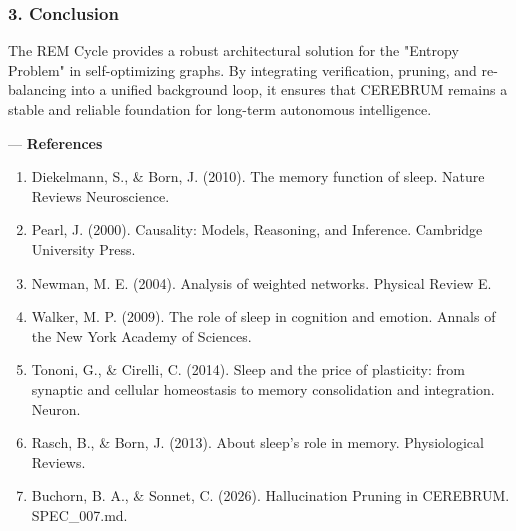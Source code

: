 \documentclass[10pt,journal,compsoc]{IEEEtran}
\begin{document}
\subsubsection{3. Conclusion}
The REM Cycle provides a robust archi\-tectural solution for the "Entropy Problem" in self-optimizing graphs. By integrating verif\-ication, pruning, and re-balancing into a unified background loop, it ensures that CEREBRUM remains a stable and reliable foundation for long-term autonomous intel\-ligence.

---
\textbf{References}
\begin{enumerate}
\item Diekelmann, S., \& Born, J. (2010). The memory function of sleep. Nature Reviews Neuros\-cience.
\item Pearl, J. (2000). Causality: Models, Reasoning, and Inference. Cambridge University Press.
\item Newman, M. E. (2004). Analysis of weighted networks. Physical Review E.
\item Walker, M. P. (2009). The role of sleep in cognition and emotion. Annals of the New York Academy of Sciences.
\item Tononi, G., \& Cirelli, C. (2014). Sleep and the price of plasticity: from synaptic and cellular homeostasis to memory conso\-lidation and integration. Neuron.
\item Rasch, B., \& Born, J. (2013). About sleep's role in memory. Physio\-logical Reviews.
\item Buchorn, B. A., \& Sonnet, C. (2026). Halluc\-ination Pruning in CEREBRUM. SPEC\_007.md.

\end{enumerate}



\end{document}
